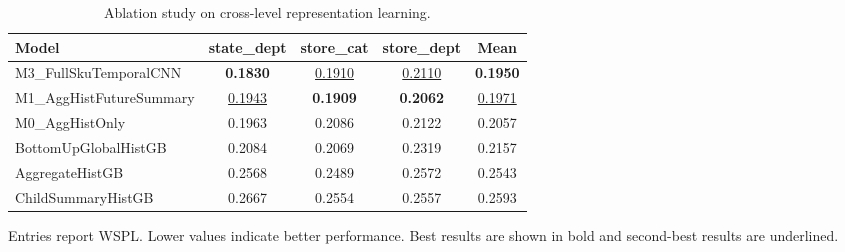 \begin{table}[H]
\centering
\caption{Ablation study on cross-level representation learning.}
\label{tab:ablation}
\begin{threeparttable}
\begin{tabular}{lcccc}
\toprule
Model & state\_dept & store\_cat & store\_dept & Mean \\
\midrule
M3\_FullSkuTemporalCNN & \textbf{0.1830} & \underline{0.1910} & \underline{0.2110} & \textbf{0.1950} \\
M1\_AggHistFutureSummary & \underline{0.1943} & \textbf{0.1909} & \textbf{0.2062} & \underline{0.1971} \\
M0\_AggHistOnly & 0.1963 & 0.2086 & 0.2122 & 0.2057 \\
BottomUpGlobalHistGB & 0.2084 & 0.2069 & 0.2319 & 0.2157 \\
AggregateHistGB & 0.2568 & 0.2489 & 0.2572 & 0.2543 \\
ChildSummaryHistGB & 0.2667 & 0.2554 & 0.2557 & 0.2593 \\
\bottomrule
\end{tabular}
\begin{tablenotes}
\footnotesize \item Entries report WSPL. Lower values indicate better performance. Best results are shown in bold and second-best results are underlined.
\end{tablenotes}
\end{threeparttable}
\end{table}
